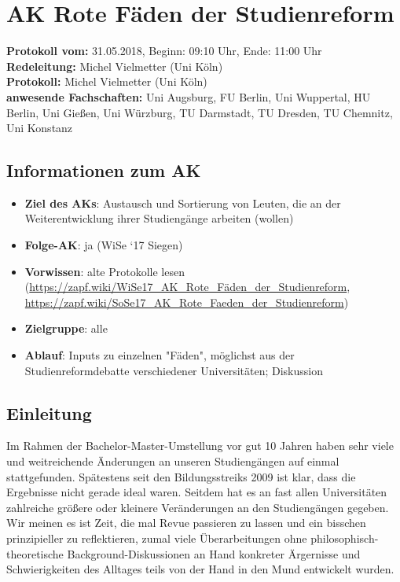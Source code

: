 
\section{AK Rote Fäden der Studienreform}

	\textbf{Protokoll vom:} 31.05.2018,
	Beginn: 09:10 Uhr,
	Ende: 11:00 Uhr \\
	\textbf{Redeleitung:} Michel Vielmetter (Uni Köln) \\
	\textbf{Protokoll:} Michel Vielmetter (Uni Köln) \\
	\textbf{anwesende Fachschaften:} Uni Augsburg, FU Berlin, Uni Wuppertal, HU Berlin, Uni Gießen, Uni Würzburg, TU Darmstadt, TU Dresden, TU Chemnitz, Uni Konstanz

	\subsection*{Informationen zum AK}
		\begin{itemize}
			\item \textbf{Ziel des AKs}: Austausch und Sortierung von Leuten, die an der Weiterentwicklung ihrer Studiengänge arbeiten (wollen)
			\item \textbf{Folge-AK}: ja (WiSe `17 Siegen)
			\item \textbf{Vorwissen}: alte Protokolle lesen (\url{https://zapf.wiki/WiSe17_AK_Rote_Fäden_der_Studienreform}, \url{https://zapf.wiki/SoSe17_AK_Rote_Faeden_der_Studienreform})
			\item \textbf{Zielgruppe}: alle
			\item \textbf{Ablauf}: Inputs zu einzelnen "Fäden", möglichst aus der Studienreformdebatte verschiedener Universitäten; Diskussion
		\end{itemize}

  \subsection{Einleitung}
    Im Rahmen der Bachelor-Master-Umstellung vor gut 10 Jahren haben sehr viele und weitreichende Änderungen an unseren Studiengängen auf einmal stattgefunden. Spätestens seit den Bildungsstreiks 2009 ist klar, dass die Ergebnisse nicht gerade ideal waren. Seitdem hat es an fast allen Universitäten zahlreiche größere oder kleinere Veränderungen an den Studiengängen gegeben. Wir meinen es ist Zeit, die mal Revue passieren zu lassen und ein bisschen prinzipieller zu reflektieren, zumal viele Überarbeitungen ohne philosophisch-theoretische Background-Diskussionen an Hand konkreter Ärgernisse und Schwierigkeiten des Alltages teils von der Hand in den Mund entwickelt wurden. \\ %

